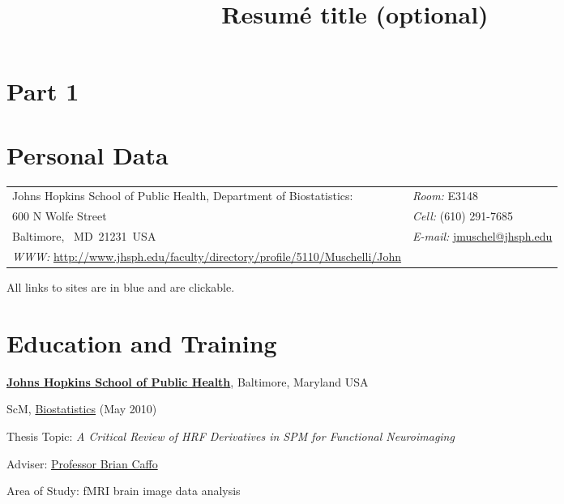 \documentclass[11pt,a4paper]{moderncv}
\title{Resumé title (optional)}               %
\begin{document}
\maketitle
\section{Part 1}



\section{ Personal Data}
%
%
%
\newlength{\rcollength}\setlength{\rcollength}{1.8in}%
%
\begin{tabular}[t]{@{}p{\textwidth-\rcollength}p{\rcollength}}
			Johns Hopkins School of Public Health, Department of Biostatistics: & \textit{Room:} E3148  \\
                          600 N Wolfe Street           & \textit{Cell:} (610) 291-7685 \\

  Baltimore, ~MD~21231~USA         & \textit{E-mail:}
\href{mailto:jmuschel@jhsph.edu}{jmuschel@jhsph.edu}\\
\textit{WWW:}
\href{http://www.jhsph.edu/faculty/directory/profile/5110/Muschelli/John}{http://www.jhsph.edu/faculty/directory/profile/5110/Muschelli/John} & \\
\end{tabular}

All links to sites are in blue and are clickable.  

\section{ \large Education and Training}
%
\href{http://www.biostat.jhsph.edu/}{\textbf{  Johns Hopkins School of Public Health}},
Baltimore, Maryland USA
\begin{outerlist}
\item[] ScM,
        \href{http://biostat.jhsph.edu/}
             {Biostatistics} (May 2010)
        \begin{innerlist}
        \item Thesis Topic: \emph{A Critical Review of HRF Derivatives in SPM for Functional Neuroimaging}
        \item Adviser:
              \href{http://www.biostat.jhsph.edu/~bcaffo/}
                   {Professor Brian Caffo}
        \item Area of Study: fMRI brain image data analysis\\
        \end{innerlist}
\end{outerlist}
        
\end{document}
